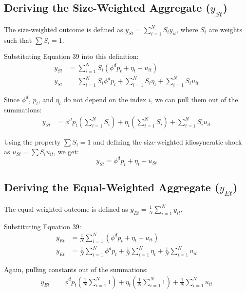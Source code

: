 \documentclass[12pt]{article}
\begin{document}
\subsection{Deriving the Size-Weighted Aggregate ($y_{St}$)}
The size-weighted outcome is defined as $y_{St} = \sum_{i=1}^N S_i y_{it}$, where $S_i$ are weights such that $\sum S_i = 1$.

Substituting Equation 39 into this definition:
\begin{align*}
    y_{St} & = \sum_{i=1}^N S_i (\phi^d p_t + \eta_t + u_{it})                                 \\
    y_{St} & = \sum_{i=1}^N S_i \phi^d p_t + \sum_{i=1}^N S_i \eta_t + \sum_{i=1}^N S_i u_{it}
\end{align*}

Since $\phi^d$, $p_t$, and $\eta_t$ do not depend on the index $i$, we can pull them out of the summations:
\begin{align*}
    y_{St} & = \phi^d p_t \left( \sum_{i=1}^N S_i \right) + \eta_t \left( \sum_{i=1}^N S_i \right) + \sum_{i=1}^N S_i u_{it}
\end{align*}

Using the property $\sum S_i = 1$ and defining the size-weighted idiosyncratic shock as $u_{St} = \sum S_i u_{it}$, we get:
\begin{equation}
    y_{St} = \phi^d p_t + \eta_t + u_{St}
\end{equation}

\subsection{Deriving the Equal-Weighted Aggregate ($y_{Et}$)}
The equal-weighted outcome is defined as $y_{Et} = \frac{1}{N} \sum_{i=1}^N y_{it}$.

Substituting Equation 39:
\begin{align*}
    y_{Et} & = \frac{1}{N} \sum_{i=1}^N (\phi^d p_t + \eta_t + u_{it})                                                 \\
    y_{Et} & = \frac{1}{N} \sum_{i=1}^N \phi^d p_t + \frac{1}{N} \sum_{i=1}^N \eta_t + \frac{1}{N} \sum_{i=1}^N u_{it}
\end{align*}

Again, pulling constants out of the summations:
\begin{align*}
    y_{Et} & = \phi^d p_t \left( \frac{1}{N} \sum_{i=1}^N 1 \right) + \eta_t \left( \frac{1}{N} \sum_{i=1}^N 1 \right) + \frac{1}{N} \sum_{i=1}^N u_{it}
\end{align*}
\end{document}

